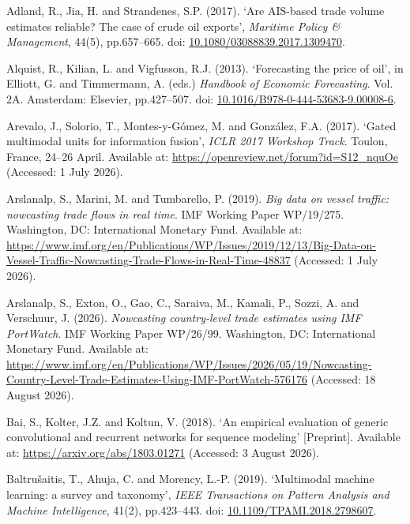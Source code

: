 \documentclass[
  british,
  12pt,
  oneside]{book}
\newlength{\cslhangindent}
\newenvironment{CSLReferences}[2] %
 {\begin{list}{}{%
  \setlength{\itemindent}{0pt}
  \setlength{\leftmargin}{0pt}
  \setlength{\parsep}{0pt}
  \ifodd #1
   \setlength{\leftmargin}{\cslhangindent}
   \setlength{\itemindent}{-1\cslhangindent}
  \fi
  \setlength{\itemsep}{#2\baselineskip}}}
 {\end{list}}
\begin{document}
\protect{}\label{refs}
\begin{CSLReferences}{0}{1}
Adland, R., Jia, H. and Strandenes, S.P. (2017). {`{Are {AIS}-based trade volume estimates reliable? The case of crude oil exports}'}, \emph{Maritime Policy \& Management}, 44(5), pp.657--665. doi: \href{https://doi.org/10.1080/03088839.2017.1309470}{10.1080/03088839.2017.1309470}.

Alquist, R., Kilian, L. and Vigfusson, R.J. (2013). {`{Forecasting the price of oil}'}, in Elliott, G. and Timmermann, A. (eds.) \emph{{Handbook of Economic Forecasting}}. Vol. 2A. Amsterdam: Elsevier, pp.427--507. doi: \href{https://doi.org/10.1016/B978-0-444-53683-9.00008-6}{10.1016/B978-0-444-53683-9.00008-6}.

Arevalo, J., Solorio, T., Montes-y-Gómez, M. and González, F.A. (2017). {`{Gated multimodal units for information fusion}'}, \emph{{ICLR 2017 Workshop Track}}. Toulon, France, 24--26 April. Available at: \url{https://openreview.net/forum?id=S12_nquOe} (Accessed: 1 July 2026).

Arslanalp, S., Marini, M. and Tumbarello, P. (2019). \emph{{Big data on vessel traffic: nowcasting trade flows in real time}}. IMF Working Paper WP/19/275. Washington, DC: International Monetary Fund. Available at: \url{https://www.imf.org/en/Publications/WP/Issues/2019/12/13/Big-Data-on-Vessel-Traffic-Nowcasting-Trade-Flows-in-Real-Time-48837} (Accessed: 1 July 2026).

Arslanalp, S., Exton, O., Gao, C., Saraiva, M., Kamali, P., Sozzi, A. and Verschuur, J. (2026). \emph{{Nowcasting country-level trade estimates using {IMF} {PortWatch}}}. IMF Working Paper WP/26/99. Washington, DC: International Monetary Fund. Available at: \url{https://www.imf.org/en/Publications/WP/Issues/2026/05/19/Nowcasting-Country-Level-Trade-Estimates-Using-IMF-PortWatch-576176} (Accessed: 18 August 2026).

Bai, S., Kolter, J.Z. and Koltun, V. (2018). {`{An empirical evaluation of generic convolutional and recurrent networks for sequence modeling}'} {[}Preprint{]}. Available at: \url{https://arxiv.org/abs/1803.01271} (Accessed: 3 August 2026).

Baltrušaitis, T., Ahuja, C. and Morency, L.-P. (2019). {`{Multimodal machine learning: a survey and taxonomy}'}, \emph{IEEE Transactions on Pattern Analysis and Machine Intelligence}, 41(2), pp.423--443. doi: \href{https://doi.org/10.1109/TPAMI.2018.2798607}{10.1109/TPAMI.2018.2798607}.


\end{CSLReferences}
\end{document}
